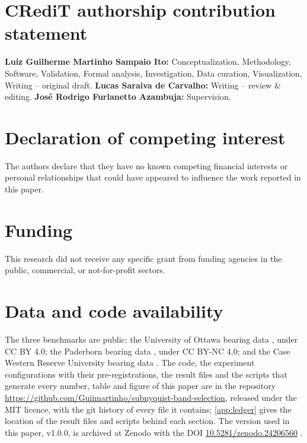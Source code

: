 \documentclass[preprint,12pt]{elsarticle}
\begin{document}
\listoftodos








\section*{CRediT authorship contribution statement}
\textbf{Luiz Guilherme Martinho Sampaio Ito:} Conceptualization, Methodology, Software, Validation,
Formal analysis, Investigation, Data curation, Visualization, Writing -- original draft.
\textbf{Lucas Saraiva de Carvalho:} Writing -- review \& editing.
\textbf{Jos\'e Rodrigo Furlanetto Azambuja:} Supervision.

\section*{Declaration of competing interest}
The authors declare that they have no known competing financial interests or personal
relationships that could have appeared to influence the work reported in this paper.

\section*{Funding}
This research did not receive any specific grant from funding agencies in the public, commercial,
or not-for-profit sectors.

\section*{Data and code availability}
The three benchmarks are public: the University of Ottawa bearing data \citep{huang2018ottawa},
under CC BY 4.0; the Paderborn bearing data \citep{lessmeier2016paderborn}, under CC BY-NC 4.0;
and the Case Western Reserve University bearing data \citep{smith2015cwru}. The code, the
experiment configurations with their pre-registrations, the result files and the scripts that
generate every number, table and figure of this paper are in the repository
\url{https://github.com/Guiimartinho/subnyquist-band-selection}, released under the MIT licence,
with the git history of every file it contains; \ref{app:ledger} gives the location of the result
files and scripts behind each section. The version used in this paper, v1.0.0, is
archived at Zenodo with the DOI
\href{https://doi.org/10.5281/zenodo.24206560}{10.5281/zenodo.24206560} \citep{ito2026code}.
\appendix
\setcounter{table}{0}
\setcounter{figure}{0}




\end{document}
